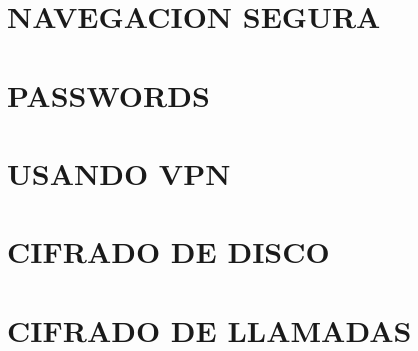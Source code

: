 \documentclass[oribibl,oneside]{scrbook}
\begin{document}
\chapter{NAVEGACION SEGURA}
\clearpage

\clearpage

\clearpage

\clearpage

\clearpage

\clearpage

\clearpage

\graphicspath{{./capitulo_09_PASSWORDS/}}
\chapter{PASSWORDS}
\clearpage

\clearpage

\clearpage

\graphicspath{{./capitulo_10_USANDO_VPN/}}
\chapter{USANDO VPN}
\clearpage

\clearpage

\clearpage

\clearpage

\clearpage

\graphicspath{{./capitulo_11_CIFRADO_DE_DISCO/}}
\chapter{CIFRADO DE DISCO}
\clearpage

\clearpage

\clearpage

\clearpage

\graphicspath{{./capitulo_12_CIFRADO_DE_LLAMADAS/}}
\chapter{CIFRADO DE LLAMADAS}
\clearpage

\graphicspath{{./capitulo_13_CIFRADO_DE_MENSAJERIA_INSTANTANEA/}}
\end{document}
